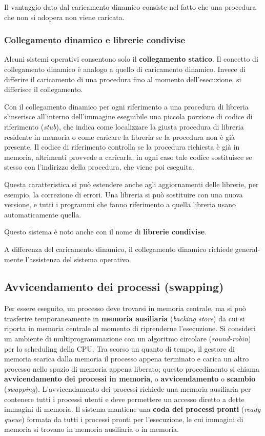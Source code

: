 \documentclass[11pt,a4paper]{article}
\begin{document}
Il vantaggio dato dal caricamento dinamico consiste nel fatto che una procedura che
non si adopera non viene caricata.

\subsubsection{Collegamento dinamico e librerie condivise}
Alcuni sistemi operativi
consentono solo il \textbf{collegamento statico}. Il concetto di collegamento dinamico è analogo a quello di caricamento
dinamico. Invece di differire il caricamento di una procedura fino al momento dell'esecu­zione, si differisce il collegamento.

Con il collegamento dinamico per ogni riferimento a una procedura di libre­ria s'inserisce all'interno dell'immagine eseguibile una piccola porzione di codice di riferi­mento (\emph{stub}), che indica come localizzare la giusta procedura di libreria residente in memo­ria o come caricare la libreria se la procedura non è già presente. Il co­dice di riferimento controlla se la procedura richiesta è già in memoria, altrimenti provvede
a caricarla; in ogni caso tale codice sostituisce se stesso con l'indirizzo della procedura, che
viene poi eseguita.

Questa caratteristica si può estendere anche agli aggiornamenti delle librerie, per
esempio, la correzione di errori. Una libreria si può sostituire con una nuova versione, e tut­ti i programmi che fanno riferimento a quella libreria usano automaticamente quella.

Questo sistema è noto anche con il nome di \textbf{librerie condivise}.

A differenza del caricamento dinamico, il collegamento dinamico richiede general­mente l'assistenza del sistema operativo.

\subsection{Avvicendamento dei processi (swapping)}
Per essere eseguito, un processo deve trovarsi in memoria centrale, ma si può trasferire tem­poraneamente in \textbf{memoria ausiliaria} (\emph{backing store}) da cui si riporta in memoria centrale al
momento di riprenderne l'esecuzione. Si consideri un ambiente di multipro­grammazione con un algoritmo circolare (\emph{round-robin}) per lo scheduling della CPU. Tra­
scorso un quanto di tempo, il gestore di memoria scarica dalla memoria il processo appena
terminato e carica un altro processo nello spazio di memoria appena liberato; questo procedimento si chiama \textbf{avvicendamento dei processi in memoria}, o \textbf{avvicendamento} o \textbf{scambio} (\emph{swapping}). L'avvicendamento dei processi richiede una memoria ausiliaria per contenere tutti i processi utenti e deve permettere un accesso diretto a dette immagini di memoria. Il
sistema mantiene una \textbf{coda dei processi pronti} (\emph{ready queue}) formata da tutti i processi
pronti per l'esecuzione, le cui immagini di memoria si trovano in memoria ausiliaria o in
memoria.
\end{document}
